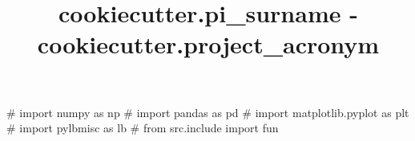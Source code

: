\documentclass{article}
\begin{document}
\title{{{cookiecutter.pi_surname}} - {{cookiecutter.project_acronym}}}
\maketitle
\tableofcontents

\begin{pycode}
# import numpy as np
# import pandas as pd
# import matplotlib.pyplot as plt
# import pylbmisc as lb
# from src.include import fun
\end{pycode}




\printbibliography 
\end{document}
